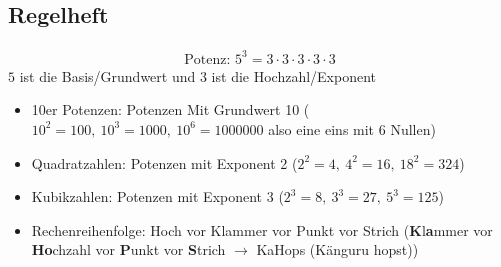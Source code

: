 \documentclass[parskip=half-,a4paper]{scrartcl} %
\begin{document}
\subsection{Regelheft}

\begin{align*}
	\text{Potenz: } 5^3=3\cdot3\cdot3\cdot3\cdot3
\end{align*}
$5$ ist die Basis/Grundwert und $3$ ist die Hochzahl/Exponent
\begin{itemize}
	\item 10er Potenzen: Potenzen Mit Grundwert 10
		($10^2=100,~10^3=1000,~10^6=1000000$ also eine eins mit 6 Nullen)
	\item Quadratzahlen: Potenzen mit Exponent 2 ($2^2=4,~4^2=16,~18^2=324$)
	\item Kubikzahlen: Potenzen mit Exponent 3 ($2^3=8,~3^3=27,~5^3=125$)
	\item Rechenreihenfolge: Hoch vor Klammer vor Punkt vor Strich
		(\textbf{K}l\textbf{a}mmer vor \textbf{Ho}chzahl vor \textbf{P}unkt vor
		\textbf{S}trich $\to$ KaHops (Känguru hopst))
\end{itemize}
\end{document}
